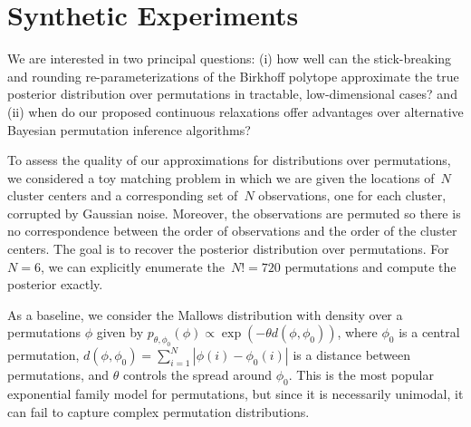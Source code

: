 \documentclass[twoside]{article}
\begin{document}
\section{Synthetic Experiments}
\label{sec:synthetic}
We are interested in two principal questions: 
 (i) how well can the stick-breaking and rounding re-parameterizations
of the Birkhoff polytope approximate the true posterior distribution
over permutations in tractable, low-dimensional cases? and (ii)
when do our proposed continuous relaxations offer
advantages over alternative  Bayesian permutation
inference algorithms?


To assess the quality of our approximations for distributions over
permutations, we considered a toy matching problem in which we are
given the locations of~$N$ cluster centers and a corresponding set
of~$N$ observations, one for each cluster, corrupted by Gaussian
noise.  Moreover, the observations are permuted so there is no
correspondence between the order of observations and the order of the
cluster centers.  The goal is to recover the posterior distribution
over permutations.  For~$N=6$, we can explicitly enumerate
the~$N!=720$ permutations and compute the posterior exactly.
 
As a baseline, we consider the Mallows distribution \cite{Mallows1957}
with density over a permutations $\phi$ given by
$p_{\theta, \phi_0}(\phi)\propto \exp(-\theta d(\phi,\phi_0))$, where
$\phi_0$ is a central permutation,
${d(\phi,\phi_0)=\sum_{i=1}^N |\phi(i)-\phi_0(i)|}$ is a distance
between permutations, and $\theta$ controls the spread around
$\phi_0$. This is the most popular exponential family model for
permutations, but since it is necessarily unimodal, it can fail to
capture complex permutation distributions.
\end{document}
